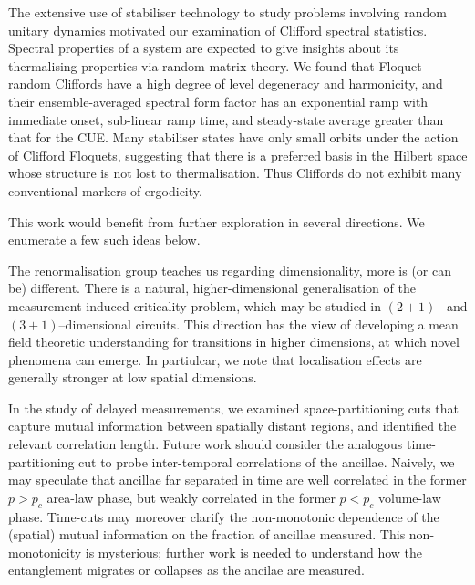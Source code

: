 \documentclass[10pt]{article}
\begin{document}
The extensive use of stabiliser technology to study problems involving random unitary dynamics motivated our examination of Clifford spectral statistics. Spectral properties of a system are expected to give insights about its thermalising properties via random matrix theory. We found that Floquet random Cliffords have a high degree of level degeneracy and harmonicity, and their ensemble-averaged spectral form factor has an exponential ramp with immediate onset, sub-linear ramp time, and steady-state average greater than that for the CUE. Many stabiliser states have only small orbits under the action of Clifford Floquets, suggesting that there is a preferred basis in the Hilbert space whose structure is not lost to thermalisation. Thus Cliffords do not exhibit many conventional markers of ergodicity. 

This work would benefit from further exploration in several directions. We enumerate a few such ideas below.

The renormalisation group teaches us regarding dimensionality, more is (or can be) different. There is a natural, higher-dimensional generalisation of the measurement-induced criticality problem, which may be studied in $(2+1)$-- and $(3+1)$--dimensional circuits. This direction has the view of developing a mean field theoretic understanding for transitions in higher dimensions, at which novel phenomena can emerge. In partiulcar, we note that localisation effects are generally stronger at low spatial dimensions.


In the study of delayed measurements, we examined space-partitioning cuts that capture mutual information between spatially distant regions, and identified the relevant correlation length. Future work should consider the analogous time-partitioning cut to probe inter-temporal correlations of the ancillae. Naively, we may speculate that ancillae far separated in time are well correlated in the former $p>p_c$ area-law phase, but weakly correlated in the former $p<p_c$ volume-law phase. Time-cuts may moreover clarify the non-monotonic dependence of the (spatial) mutual information on the fraction of ancillae measured. This non-monotonicity is mysterious; further work is needed to understand how the entanglement migrates or collapses as the ancilae are measured.
\end{document}
